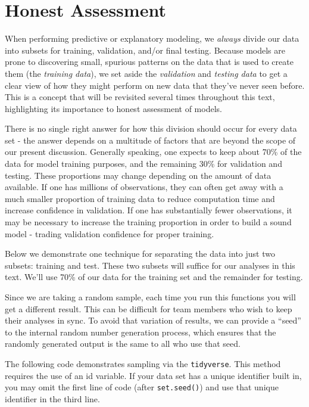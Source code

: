 \documentclass[
  letterpaper,
  DIV=11,
  numbers=noendperiod]{scrreprt}
\begin{document}
\hypertarget{sec-trainvalidtest}{%
\section{Honest Assessment}\label{sec-trainvalidtest}}

When performing predictive or explanatory modeling, we \emph{always}
divide our data into subsets for training, validation, and/or final
testing. Because models are prone to discovering small, spurious
patterns on the data that is used to create them (the \emph{training
data}), we set aside the \emph{validation} and \emph{testing data} to
get a clear view of how they might perform on new data that they've
never seen before. This is a concept that will be revisited several
times throughout this text, highlighting its importance to honest
assessment of models.

There is no single right answer for how this division should occur for
every data set - the answer depends on a multitude of factors that are
beyond the scope of our present discussion. Generally speaking, one
expects to keep about 70\% of the data for model training purposes, and
the remaining 30\% for validation and testing. These proportions may
change depending on the amount of data available. If one has millions of
observations, they can often get away with a much smaller proportion of
training data to reduce computation time and increase confidence in
validation. If one has substantially fewer observations, it may be
necessary to increase the training proportion in order to build a sound
model - trading validation confidence for proper training.

Below we demonstrate one technique for separating the data into just two
subsets: training and test. These two subsets will suffice for our
analyses in this text. We'll use 70\% of our data for the training set
and the remainder for testing.

Since we are taking a random sample, each time you run this functions
you will get a different result. This can be difficult for team members
who wish to keep their analyses in sync. To avoid that variation of
results, we can provide a ``seed'' to the internal random number
generation process, which ensures that the randomly generated output is
the same to all who use that seed.

The following code demonstrates sampling via the \texttt{tidyverse}.
This method requires the use of an id variable. If your data set has a
unique identifier built in, you may omit the first line of code (after
\texttt{set.seed()}) and use that unique identifier in the third line.
\end{document}
